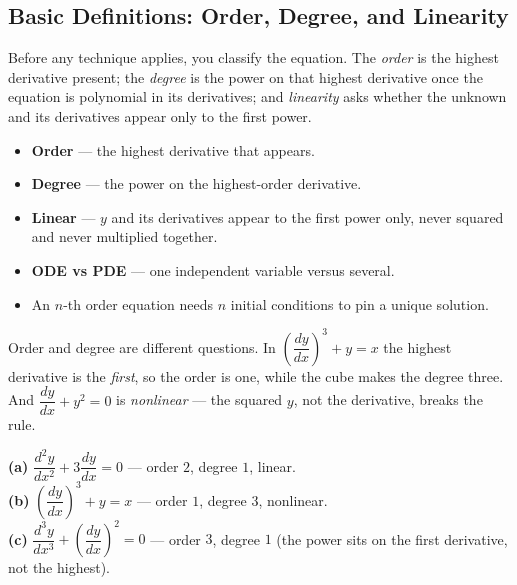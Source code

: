 \subsection{Basic Definitions: Order, Degree, and Linearity}

Before any technique applies, you classify the equation. The \emph{order} is the
highest derivative present; the \emph{degree} is the power on that highest
derivative once the equation is polynomial in its derivatives; and
\emph{linearity} asks whether the unknown and its derivatives appear only to the
first power.

\begin{formulabox}
\begin{itemize}[leftmargin=1.4em, itemsep=2pt]
    \item \textbf{Order} --- the highest derivative that appears.
    \item \textbf{Degree} --- the power on the highest-order derivative.
    \item \textbf{Linear} --- $y$ and its derivatives appear to the first power
          only, never squared and never multiplied together.
    \item \textbf{ODE vs PDE} --- one independent variable versus several.
    \item An $n$-th order equation needs $n$ initial conditions to pin a unique
          solution.
\end{itemize}
\end{formulabox}

\begin{warningbox}
Order and degree are different questions. In $\left(\dfrac{dy}{dx}\right)^{3} + y
= x$ the highest derivative is the \emph{first}, so the order is one, while the
cube makes the degree three. And $\dfrac{dy}{dx} + y^{2} = 0$ is
\emph{nonlinear} --- the squared $y$, not the derivative, breaks the rule.
\end{warningbox}

\begin{examplebox}
\textbf{(a)} $\dfrac{d^{2}y}{dx^{2}} + 3\dfrac{dy}{dx} = 0$ --- order $2$,
degree $1$, linear.\\
\textbf{(b)} $\left(\dfrac{dy}{dx}\right)^{3} + y = x$ --- order $1$, degree $3$,
nonlinear.\\
\textbf{(c)} $\dfrac{d^{3}y}{dx^{3}} + \left(\dfrac{dy}{dx}\right)^{2} = 0$ ---
order $3$, degree $1$ (the power sits on the first derivative, not the highest).
\end{examplebox}

